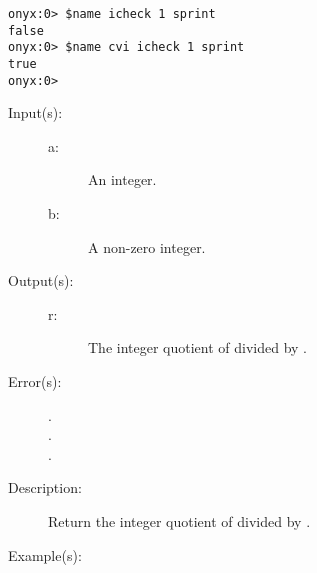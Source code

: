 \begin{description}
\begin{description}
\begin{verbatim}
onyx:0> $name icheck 1 sprint
false
onyx:0> $name cvi icheck 1 sprint
true
onyx:0>
		\end{verbatim}
	\end{description}
\label{systemdict:idiv}
\item[{\onyxop{a b}{idiv}{r}}: ]
	\begin{description}\item[]
	\item[Input(s): ]
		\begin{description}\item[]
		\item[a: ]
			An integer.
		\item[b: ]
			A non-zero integer.
		\end{description}
	\item[Output(s): ]
		\begin{description}\item[]
		\item[r: ]
			The integer quotient of  divided by .
		\end{description}
	\item[Error(s): ]
		\begin{description}\item[]
		\item[.]
		\item[.]
		\item[.]
		\end{description}
	\item[Description: ]
		Return the integer quotient of  divided by .
	\item[Example(s): ]\begin{verbatim}


\end{verbatim}
\end{description}
\end{description}
